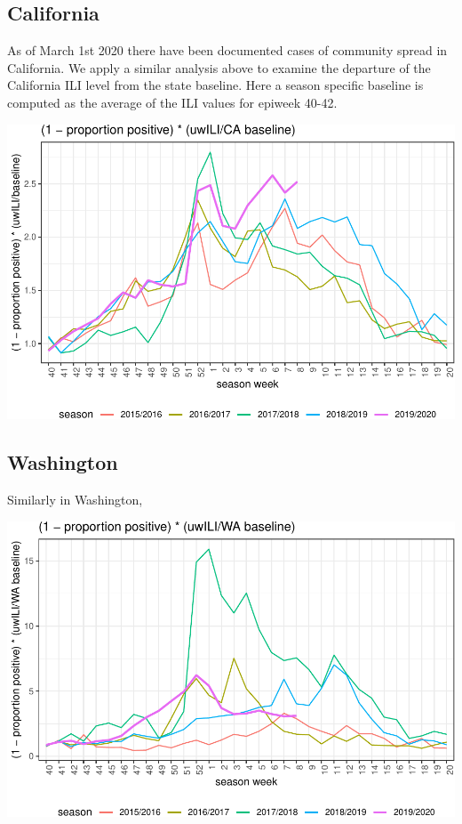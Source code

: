 \documentclass[]{article}
\begin{document}
\hypertarget{california}{%
\subsection{California}\label{california}}

As of March 1st 2020 there have been documented cases of community
spread in California. We apply a similar analysis above to examine the
departure of the California ILI level from the state baseline. Here a
season specific baseline is computed as the average of the ILI values
for epiweek 40-42.

\includegraphics{ili-labtest-report_files/figure-latex/get-all-california-data-1.pdf}

\hypertarget{washington}{%
\subsection{Washington}\label{washington}}

Similarly in Washington,

\includegraphics{ili-labtest-report_files/figure-latex/get-all-washington-data-1.pdf}
\end{document}
